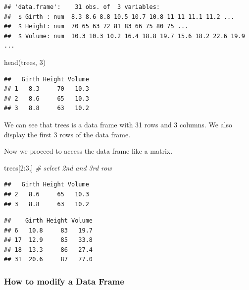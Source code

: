 \documentclass[
]{book}
\newenvironment{Shaded}{\begin{snugshade}}{\end{snugshade}}
\newcommand{\CommentTok}[1]{\textcolor[rgb]{0.56,0.35,0.01}{\textit{#1}}}
\newcommand{\DecValTok}[1]{\textcolor[rgb]{0.00,0.00,0.81}{#1}}
\newcommand{\FunctionTok}[1]{\textcolor[rgb]{0.00,0.00,0.00}{#1}}
\newcommand{\NormalTok}[1]{#1}
\newcommand{\SpecialCharTok}[1]{\textcolor[rgb]{0.00,0.00,0.00}{#1}}
\theoremstyle{definition}
\theoremstyle{definition}
\theoremstyle{definition}
\theoremstyle{definition}
\theoremstyle{remark}
\begin{document}
\begin{verbatim}
## 'data.frame':    31 obs. of  3 variables:
##  $ Girth : num  8.3 8.6 8.8 10.5 10.7 10.8 11 11 11.1 11.2 ...
##  $ Height: num  70 65 63 72 81 83 66 75 80 75 ...
##  $ Volume: num  10.3 10.3 10.2 16.4 18.8 19.7 15.6 18.2 22.6 19.9 ...
\end{verbatim}

\begin{Shaded}
\begin{Highlighting}[]
\FunctionTok{head}\NormalTok{(trees, }\DecValTok{3}\NormalTok{)}
\end{Highlighting}
\end{Shaded}

\begin{verbatim}
##   Girth Height Volume
## 1   8.3     70   10.3
## 2   8.6     65   10.3
## 3   8.8     63   10.2
\end{verbatim}

We can see that trees is a data frame with 31 rows and 3 columns. We also display the first 3 rows of the data frame.

Now we proceed to access the data frame like a matrix.

\begin{Shaded}
\begin{Highlighting}[]
\NormalTok{trees[}\DecValTok{2}\SpecialCharTok{:}\DecValTok{3}\NormalTok{,]    }\CommentTok{\# select 2nd and 3rd row}
\end{Highlighting}
\end{Shaded}

\begin{verbatim}
##   Girth Height Volume
## 2   8.6     65   10.3
## 3   8.8     63   10.2
\end{verbatim}

\begin{Shaded}
\end{Shaded}

\begin{verbatim}
##    Girth Height Volume
## 6   10.8     83   19.7
## 17  12.9     85   33.8
## 18  13.3     86   27.4
## 31  20.6     87   77.0
\end{verbatim}

\hypertarget{how-to-modify-a-data-frame}{%
\subsubsection{How to modify a Data Frame}\label{how-to-modify-a-data-frame}}
\end{document}
